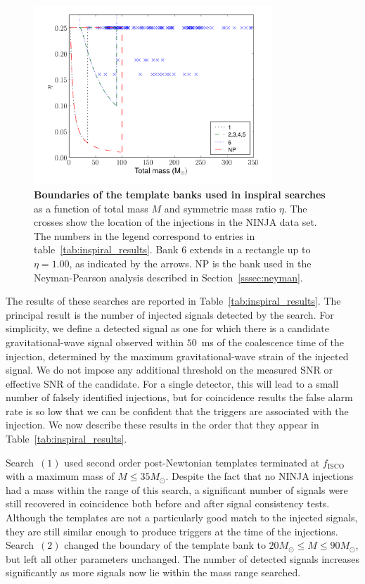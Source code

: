 \begin{figure}
  \begin{center}
  \includegraphics[width=0.8\textwidth]{figures/ninja1/ninja_banks}
  \end{center}
  \caption{{\bf Boundaries of the template banks used in inspiral searches} as a
  function of total mass $M$ and symmetric mass ratio $\eta$. The crosses show
  the location of the injections in the NINJA data set. The numbers in the
  legend correspond to entries in table~\ref{tab:inspiral_results}. Bank 6
  extends in a rectangle up to $\eta = 1.00$, as indicated by the arrows. NP
  is the bank used in the Neyman-Pearson analysis described in 
  Section~\ref{sssec:neyman}.}
  \label{f:ninjaBanks}
\end{figure}

The results of these searches are reported in
Table~\ref{tab:inspiral_results}.  The principal result is the number of
injected signals detected by the search.  For simplicity, we define a
detected signal as one for which there is a candidate gravitational-wave
signal observed within $50$~ms of the coalescence time of the injection,
determined by the maximum gravitational-wave strain of the injected
signal.  We do not impose any additional threshold on the measured SNR or
effective SNR of the candidate.  For a single detector, this will lead
to a small number of falsely identified injections, but for coincidence
results the false alarm rate is so low that we can be confident that the
triggers are associated with the injection. We now describe these
results in the order that they appear in
Table~\ref{tab:inspiral_results}.

Search~$(1)$ used second order post-Newtonian templates terminated at
$f_\mathrm{ISCO}$ with a maximum mass of $M \le 35 M_{\odot}$.  Despite the
fact that no NINJA injections had a mass within the range of this search, a
significant number of signals were still recovered in coincidence both before
and after signal consistency tests.  Although the templates are not a
particularly good match to the injected signals, they are still similar enough
to produce triggers at the time of the injections.  Search~$(2)$ changed the
boundary of the template bank to $20 M_\odot \le M \le 90 M_{\odot}$, but left
all other parameters unchanged.  The number of detected signals increases
significantly as more signals now lie within the mass range searched. 

